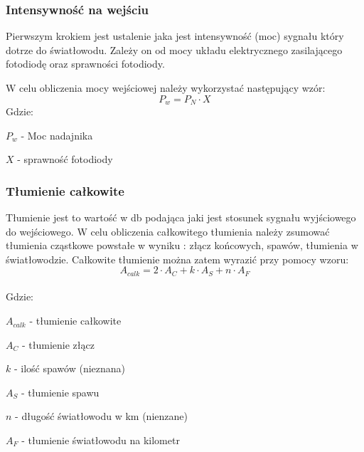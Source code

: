\documentclass[paper=a4, fontsize=11pt]{scrartcl} %
\numberwithin{equation}{section} %
\numberwithin{figure}{section} %
\numberwithin{table}{section} %
\begin{document}
\subsubsection{Intensywność na wejściu}

Pierwszym krokiem jest ustalenie jaka jest intensywność (moc) sygnału który dotrze do światłowodu. Zależy on od mocy układu elektrycznego zasilającego
fotodiodę oraz sprawności fotodiody.

W celu obliczenia mocy wejściowej należy wykorzystać następujący wzór:
\begin{equation} \label{eq:moc} 
P_w = P_N \cdot X
\end{equation}
Gdzie:\\
\par \setlength\parindent{24pt}
\(P_w\) - Moc nadajnika\\
\par \setlength\parindent{24pt}
\(X\) - sprawność fotodiody\newline

\subsubsection{Tłumienie całkowite}

Tłumienie jest to wartość w db podająca jaki jest stosunek sygnału wyjściowego do wejściowego. W celu obliczenia całkowitego tłumienia należy zsumować
tłumienia cząstkowe powstałe w wyniku : złącz końcowych, spawów, tłumienia w światłowodzie.
Całkowite tłumienie można zatem wyrazić przy pomocy wzoru:
\begin{equation} \label{eq:sprawnosc} 
  A_{calk} = 2\cdot A_C + k \cdot A_S + n \cdot A_F
\end{equation}\\
Gdzie:\\
\par \setlength\parindent{24pt}
\(A_{calk}\) - tłumienie całkowite\\
\par \setlength\parindent{24pt}
\(A_C\) - tłumienie złącz\\
\par \setlength\parindent{24pt}
\(k\) - ilość spawów (nieznana)\\
\par \setlength\parindent{24pt}
\(A_S\) - tłumienie spawu\\
\par \setlength\parindent{24pt}
\(n\) - długość światłowodu w km (nienzane)\\
\par \setlength\parindent{24pt}
\(A_F\) - tłumienie światłowodu na kilometr\newline
\end{document}
